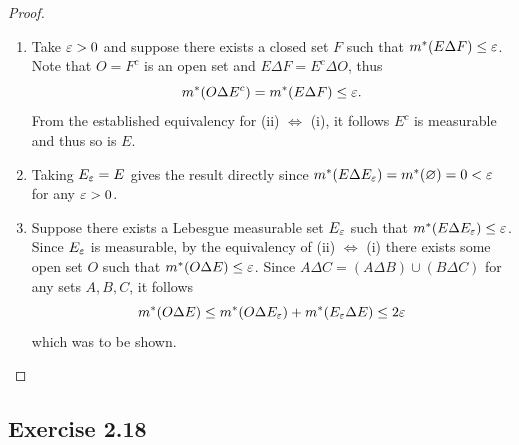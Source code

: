 \documentclass[hw_all.tex]{subfiles}
\begin{document}
\begin{proof}
\begin{enumerate}
        \item[iv $\Rightarrow$ i)]
            Take $\varepsilon > 0$ and suppose there exists a closed set $F$ such that $m^*(E \Delta F) \leq \varepsilon$. Note that $O = F^c$ is an open set and $E \Delta F = E^c \Delta O$, thus
            \[
                m^*(O \Delta E^c) = m^*(E \Delta F) \leq \varepsilon
            .\]
            From the established equivalency for (ii) $\Leftrightarrow$ (i), it follows $E^c$ is measurable and thus so is $E$.

            
        \item[i $\Rightarrow$ v)]
            Taking $E_\varepsilon = E$ gives the result directly since $m^*(E \Delta E_\varepsilon) = m^*(\varnothing) = 0 < \varepsilon$ for any $\varepsilon > 0$.

        \item[v $\Rightarrow$ ii)]
            Suppose there exists a Lebesgue measurable set $E_\varepsilon$ such that $m^*(E \Delta E_\varepsilon) \leq \varepsilon$. Since $E_\varepsilon$ is measurable, by the equivalency of (ii) $\Leftrightarrow$ (i) there exists some open set $O$ such that $m^*(O \Delta E) \leq \varepsilon$. Since $A \Delta C = (A \Delta B) \cup (B \Delta C)$ for any sets $A, B, C$, it follows
            \[
                m^*(O \Delta E) \leq m^*(O \Delta E_\varepsilon) + m^*(E_\varepsilon \Delta E) \leq 2\varepsilon
            \]
            which was to be shown.
    \end{enumerate}
\end{proof}

\subsection{Exercise 2.18}
\end{document}
